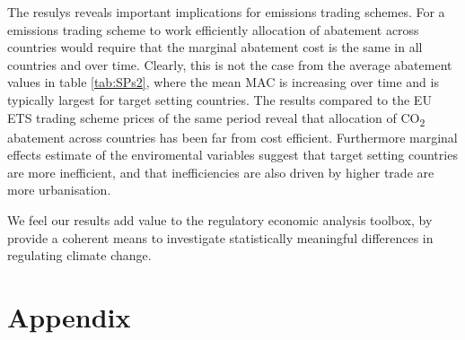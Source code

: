 \documentclass[12pt,]{article}
\begin{document}
The resulys reveals important implications for emissions trading schemes. For a emissions trading scheme to work efficiently allocation of abatement across countries would require that the marginal abatement cost is the same in all countries and over time. Clearly, this is not the case from the average abatement values in table \ref{tab:SPs2}, where the mean MAC is increasing over time and is typically largest for target setting countries. The results compared to the EU ETS trading scheme prices of the same period reveal that allocation of CO\textsubscript{2} abatement across countries has been far from cost efficient.
Furthermore marginal effects estimate of the enviromental variables suggest that target setting countries are more inefficient, and that inefficiencies are also driven by higher trade are more urbanisation.

We feel our results add value to the regulatory economic analysis toolbox, by provide a coherent means to investigate statistically meaningful differences in regulating climate change.

\hypertarget{appendix}{%
\section{Appendix}\label{appendix}}

\begingroup\fontsize{10}{12}\selectfont
\end{document}
